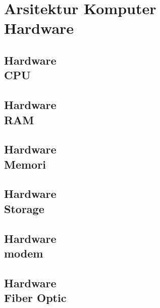 \documentclass{WileySix}
\begin{document}
\part[Hardware dan Networking]
{Arsitektur Komputer\\ Hardware}

%

\chapter[CPU atau Prosesor]
{Hardware\\ CPU}


\chapter[RAM]
{Hardware\\ RAM}


%

\chapter[Memori]
{Hardware\\ Memori}


\chapter[Storage]
{Hardware\\ Storage}



\chapter[Modem]
{Hardware\\ modem}



\chapter[Fiber Optic]
{Hardware\\ Fiber Optic}

\end{document}

